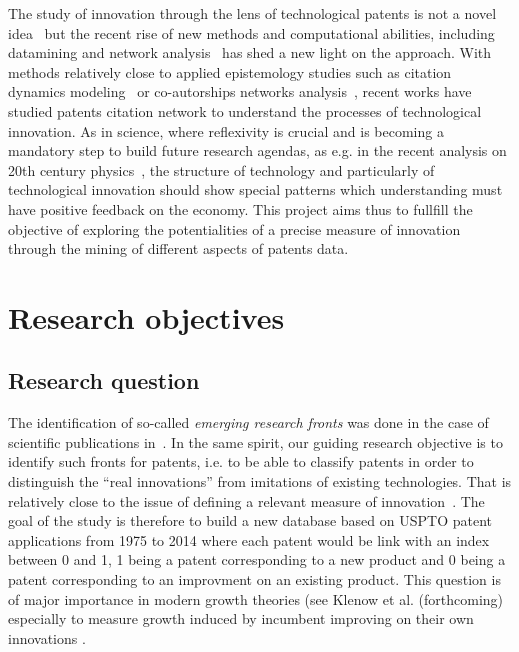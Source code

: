 

The study of innovation through the lens of technological patents is not a novel idea~\cite{basberg1987patents} but the recent rise of new methods and computational abilities, including datamining and network analysis~\cite{newman2010networks} has shed a new light on the approach. With methods relatively close to applied epistemology studies such as citation dynamics modeling~\cite{2013arXiv1310.8220N} or co-autorships networks analysis~\cite{2014arXiv1402.7268S}, recent works have studied patents citation network to understand the processes of technological innovation. As in science, where reflexivity is crucial and is becoming a mandatory step to build future research agendas, as e.g. in the recent analysis on 20th century physics~\cite{Sinatra:2015yu}, the structure of technology and particularly of technological innovation should show special patterns which understanding must have positive feedback on the economy.
This project aims thus to fullfill the objective of exploring the potentialities of a precise measure of innovation through the mining of different aspects of patents data.





\section{Research objectives}


\subsection{Research question}

The identification of so-called \emph{emerging research fronts} was done in the case of scientific publications in~\cite{shibata2008detecting}. In the same spirit, our guiding research objective is to identify such fronts for patents, i.e. to be able to classify patents in order to distinguish the ``real innovations'' from imitations of existing technologies. That is relatively close to the issue of defining a relevant measure of innovation~\cite{archibugi1988search}. The goal of the study is therefore to build a new database based on USPTO patent applications from 1975 to 2014 where each patent would be link with an index between 0 and 1, 1 being a patent corresponding to a new product and 0 being a patent corresponding to an improvment on an existing product. This question is of major importance in modern growth theories (see Klenow et al. (forthcoming) especially to measure growth induced by incumbent improving on their own innovations \cite{KletteKortum2002}.




